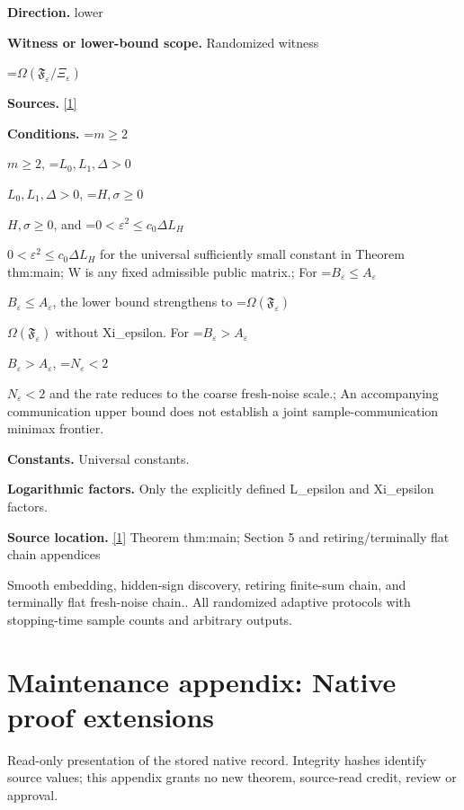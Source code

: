 \documentclass[10pt,a4paper]{article}
\newcommand{\AtlasMath}[1]{\par\begingroup\centering\setbox0=\hbox{$\displaystyle #1$}\ifdim\wd0>1.4\linewidth\typeout{ATLAS WIDE FORMULA: \the\wd0}\fi\ifdim\wd0>\linewidth\resizebox{\linewidth}{!}{\box0}\else\box0\fi\par\endgroup}
\newcommand{\AtlasInlineMath}[1]{\begingroup\setbox0=\hbox{$#1$}\ifdim\wd0>.4\linewidth\endgroup\AtlasMath{#1}\else\endgroup$#1$\fi}
\begin{document}
\textbf{Direction.} lower



\textbf{Witness or lower-bound scope.} Randomized witness



\AtlasMath{\Omega(\mathfrak F_\varepsilon/\Xi_\varepsilon)}


\textbf{Sources.} \href{https://github.com/WU-Wendao/Colombo/blob/main/colombo_sensorium/Complexity_altas/data/sources/colombo/N15/manuscript.pdf}{[1]}



\textbf{Conditions.} \AtlasInlineMath{m\ge2}, \AtlasInlineMath{L_0,L_1,\Delta>0}, \AtlasInlineMath{H,\sigma\ge0}, and \AtlasInlineMath{0<\varepsilon^2\le c_0\Delta L_H} for the universal sufficiently small constant in Theorem thm:main; W is any fixed admissible public matrix.; For \AtlasInlineMath{B_\varepsilon\le A_\varepsilon}, the lower bound strengthens to \AtlasInlineMath{\Omega(\mathfrak F_\varepsilon)} without Xi\_epsilon. For \AtlasInlineMath{B_\varepsilon>A_\varepsilon}, \AtlasInlineMath{N_\varepsilon<2} and the rate reduces to the coarse fresh-noise scale.; An accompanying communication upper bound does not establish a joint sample-communication minimax frontier.



\textbf{Constants.} Universal constants.



\textbf{Logarithmic factors.} Only the explicitly defined L\_epsilon and Xi\_epsilon factors.



\textbf{Source location.} \href{https://github.com/WU-Wendao/Colombo/blob/main/colombo_sensorium/Complexity_altas/data/sources/colombo/N15/manuscript.pdf}{[1]} Theorem thm:main; Section 5 and retiring/terminally flat chain appendices



Smooth embedding, hidden-sign discovery, retiring finite-sum chain, and terminally flat fresh-noise chain.. All randomized adaptive protocols with stopping-time sample counts and arbitrary outputs.



\section{Maintenance appendix: Native proof extensions}


Read-only presentation of the stored native record. Integrity hashes identify source values; this appendix grants no new theorem, source-read credit, review or approval.
\end{document}
